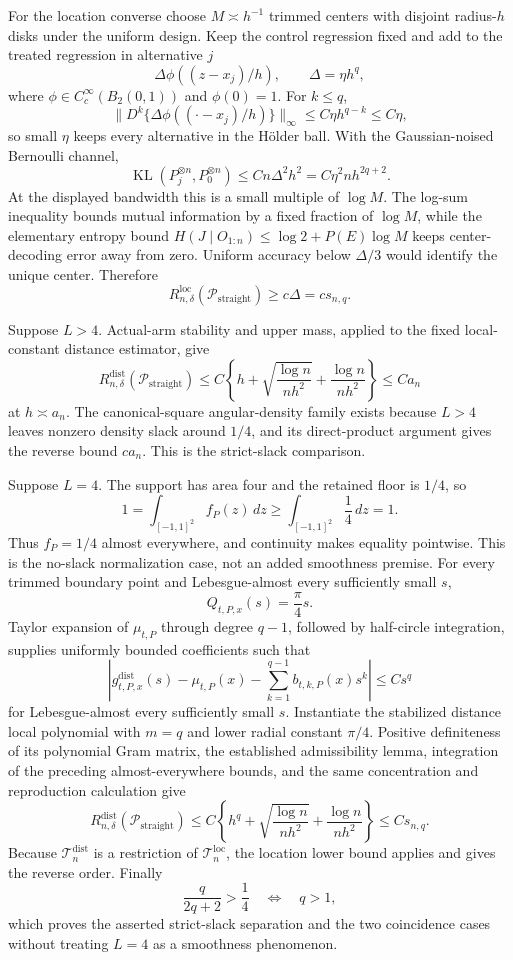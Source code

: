 For the location converse choose \(M\asymp h^{-1}\) trimmed centers with disjoint radius-\(h\) disks under the uniform design.  Keep the control regression fixed and add to the treated regression in alternative \(j\)
\[
 \Delta\phi((z-x_j)/h),
 \qquad \Delta=\eta h^q,
\]
where \(\phi\in C_c^\infty(B_2(0,1))\) and \(\phi(0)=1\).  For \(k\leq q\),
\[
 \lVert D^k\{\Delta\phi((\cdot-x_j)/h)\}\rVert_\infty
 \leq C\eta h^{q-k}\leq C\eta,
\]
so small \(\eta\) keeps every alternative in the H\"older ball.  With the Gaussian-noised Bernoulli channel,
\[
 \operatorname{KL}(P_j^{\otimes n},P_0^{\otimes n})
 \leq Cn\Delta^2h^2=C\eta^2nh^{2q+2}.
\]
At the displayed bandwidth this is a small multiple of \(\log M\).  The log-sum inequality bounds mutual information by a fixed fraction of \(\log M\), while the elementary entropy bound \(H(J\mid O_{1:n})\leq\log2+P(E)\log M\) keeps center-decoding error away from zero.  Uniform accuracy below \(\Delta/3\) would identify the unique center.  Therefore
\[
 R_{n,\delta}^{\mathrm{loc}}(\mathcal P_{\mathrm{straight}})
 \geq c\Delta=cs_{n,q}.
\]

Suppose \(L>4\).  Actual-arm stability and upper mass, applied to the fixed local-constant distance estimator, give
\[
 R_{n,\delta}^{\mathrm{dist}}(\mathcal P_{\mathrm{straight}})
 \leq C\left\{h+\sqrt{\frac{\log n}{nh^2}}+\frac{\log n}{nh^2}\right\}
 \leq Ca_n
\]
at \(h\asymp a_n\).  The canonical-square angular-density family exists because \(L>4\) leaves nonzero density slack around \(1/4\), and its direct-product argument gives the reverse bound \(ca_n\).  This is the strict-slack comparison.

Suppose \(L=4\).  The support has area four and the retained floor is \(1/4\), so
\[
 1=\int_{[-1,1]^2}f_P(z)\,dz
 \geq\int_{[-1,1]^2}\frac14\,dz=1.
\]
Thus \(f_P=1/4\) almost everywhere, and continuity makes equality pointwise.  This is the no-slack normalization case, not an added smoothness premise.  For every trimmed boundary point and Lebesgue-almost every sufficiently small \(s\),
\[
 Q_{t,P,x}(s)=\frac\pi4s.
\]
Taylor expansion of \(\mu_{t,P}\) through degree \(q-1\), followed by half-circle integration, supplies uniformly bounded coefficients such that
\[
 \left|g^{\mathrm{dist}}_{t,P,x}(s)-\mu_{t,P}(x)
 -\sum_{k=1}^{q-1}b_{t,k,P}(x)s^k\right|\leq Cs^q
\]
for Lebesgue-almost every sufficiently small \(s\).  Instantiate the stabilized distance local polynomial with \(m=q\) and lower radial constant \(\pi/4\).  Positive definiteness of its polynomial Gram matrix, the established admissibility lemma, integration of the preceding almost-everywhere bounds, and the same concentration and reproduction calculation give
\[
 R_{n,\delta}^{\mathrm{dist}}(\mathcal P_{\mathrm{straight}})
 \leq C\left\{h^q+\sqrt{\frac{\log n}{nh^2}}+\frac{\log n}{nh^2}\right\}
 \leq Cs_{n,q}.
\]
Because \(\mathcal T_n^{\mathrm{dist}}\) is a restriction of \(\mathcal T_n^{\mathrm{loc}}\), the location lower bound applies and gives the reverse order.  Finally
\[
 \frac{q}{2q+2}>\frac14\quad\Longleftrightarrow\quad q>1,
\]
which proves the asserted strict-slack separation and the two coincidence cases without treating \(L=4\) as a smoothness phenomenon.